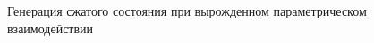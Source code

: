 \begin{figure}
\centering



\caption{Генерация сжатого состояния при вырожденном параметрическом
  взаимодействии} 
\label{figPart3Squeezed_11}
\end{figure}
